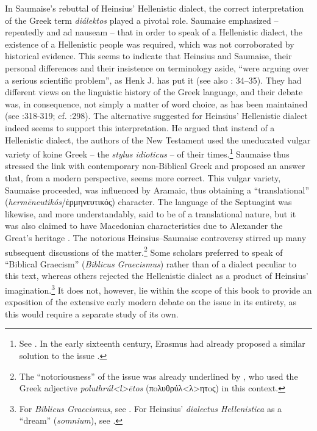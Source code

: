 In Saumaise’s rebuttal of Heinsius’ Hellenistic dialect, the correct interpretation of the Greek term \textit{diálektos} played a pivotal role. Saumaise emphasized – repeatedly and ad nauseam – that in order to speak of a Hellenistic dialect, the existence of a Hellenistic people was required, which was not corroborated by historical evidence. This seems to indicate that Heinsius and Saumaise, their personal differences and their insistence on terminology aside, “were arguing over a serious scientific problem”, as Henk J. \citet[117]{De1981} has put it (see also \citealt{De1980}: 34–35). They had different views on the linguistic history of the Greek language, and their debate was, in consequence, not simply a matter of word choice, as has been maintained (see \citealt{Simon1689}:318-319; cf. \citealt{Considine2012}:298). The alternative \citet[98–99, 240–266]{Saumaise1643a} suggested for Heinsius’ Hellenistic dialect indeed seems to support this interpretation. He argued that instead of a Hellenistic dialect, the authors of the New Testament used the uneducated vulgar variety of koine Greek – the \textit{stylus idioticus} – of their times.\footnote{See \citet[34-35]{De1980}. In the early sixteenth century, Erasmus had already proposed a similar solution to the issue \citep[181]{Bentley1983}.} Saumaise thus stressed the link with contemporary non-Biblical Greek and proposed an answer that, from a modern perspective, seems more correct. This vulgar variety, Saumaise proceeded, was influenced by Aramaic, thus obtaining a “translational” (\textit{hermēneutikós}/ἑρμηνευτικός) character. The language of the Septuagint was likewise, and more understandably, said to be of a translational nature, but it was also claimed to have Macedonian characteristics due to Alexander the Great’s heritage \citep[264]{Saumaise1643a}. The notorious Heinsius–Saumaise controversy stirred up many subsequent discussions of the matter.\footnote{The “notoriousness” of the issue was already underlined by \citet[\textsc{ii.}74]{Morhof1708}, who used the Greek adjective \textit{poluthrúl<l>ētos}  (πoλυθρύλ<λ>ητoς) in this context.} Some scholars preferred to speak of “Biblical Graecism” (\textit{Biblicus Graecismus}) rather than of a dialect peculiar to this text, whereas others rejected the Hellenistic dialect as a product of Heinsius’ imagination.\footnote{For \textit{Biblicus Graecismus}, see \citet[\textsc{b.3}\textsc{\textsuperscript{v}}]{Bolius1689}. For Heinsius’ \textit{dialectus Hellenistica} as a “dream” (\textit{somnium}), see \citet{De1644}.} It does not, however, lie within the scope of this book to provide an exposition of the extensive early modern debate on the issue in its entirety, as this would require a separate study of its own.

